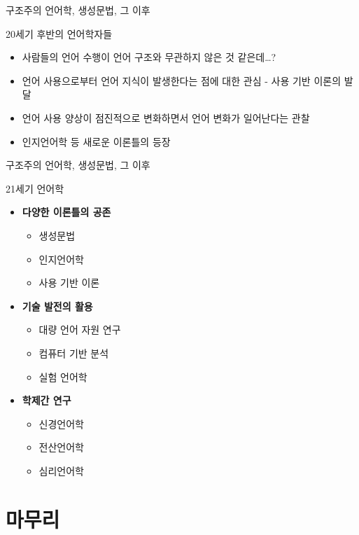 \documentclass[11pt, aspectratio=169]{beamer}
\begin{document}
\begin{frame}[t]{구조주의 언어학, 생성문법, 그 이후}
  \begin{block}{20세기 후반의 언어학자들}
    \begin{itemize}
      \item 사람들의 언어 수행이 언어 구조와 무관하지 않은 것 같은데…?
      \item 언어 사용으로부터 언어 지식이 발생한다는 점에 대한 관심 - 사용 기반 이론의 발달
      \item 언어 사용 양상이 점진적으로 변화하면서 언어 변화가 일어난다는 관찰
      \item 인지언어학 등 새로운 이론틀의 등장
    \end{itemize}
  \end{block}
\end{frame}

\begin{frame}[t]{구조주의 언어학, 생성문법, 그 이후}
  \begin{block}{21세기 언어학}
    \begin{itemize}
      \item \textbf{다양한 이론틀의 공존}
        \begin{itemize}
          \item 생성문법
          \item 인지언어학
          \item 사용 기반 이론
        \end{itemize}
    \item \textbf{기술 발전의 활용}
        \begin{itemize}
          \item 대량 언어 자원 연구
          \item 컴퓨터 기반 분석
          \item 실험 언어학
        \end{itemize}
    \item \textbf{학제간 연구}
        \begin{itemize}
          \item 신경언어학
          \item 전산언어학
          \item 심리언어학
        \end{itemize}
    \end{itemize}    
  \end{block}
\end{frame}

\section{마무리}
\end{document}
